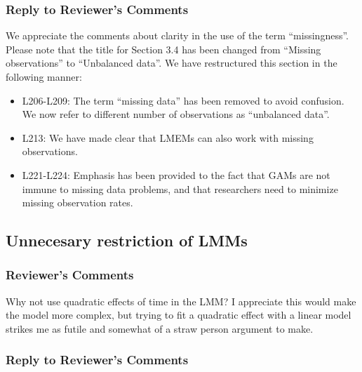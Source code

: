\documentclass[
]{article}
\begin{document}
\hypertarget{section-1}{%
\subsubsection{\texorpdfstring{\textcolor{reviewersblue} {Reply to Reviewer's Comments}}{}}\label{section-1}}

We appreciate the comments about clarity in the use of the term ``missingness''. Please note that the title for Section 3.4 has been changed from ``Missing observations'' to ``Unbalanced data''. We have restructured this section in the following manner:

\begin{itemize}
\item
  L206-L209: The term ``missing data'' has been removed to avoid confusion. We now refer to different number of observations as ``unbalanced data''.
\item
  L213: We have made clear that LMEMs can also work with missing observations.
\item
  L221-L224: Emphasis has been provided to the fact that GAMs are not immune to missing data problems, and that researchers need to minimize missing observation rates.
\end{itemize}

\hypertarget{unnecesary-restriction-of-lmms}{%
\subsection{Unnecesary restriction of LMMs}\label{unnecesary-restriction-of-lmms}}

\hypertarget{reviewers-comments-1}{%
\subsubsection{Reviewer's Comments}\label{reviewers-comments-1}}

Why not use quadratic effects of time in the LMM? I appreciate this would make the model more complex, but trying to fit a quadratic effect with a linear model strikes me as futile and somewhat of a straw person argument to make.

\hypertarget{section-2}{%
\subsubsection{\texorpdfstring{\textcolor{reviewersblue} {Reply to Reviewer's Comments}}{}}\label{section-2}}
\end{document}

